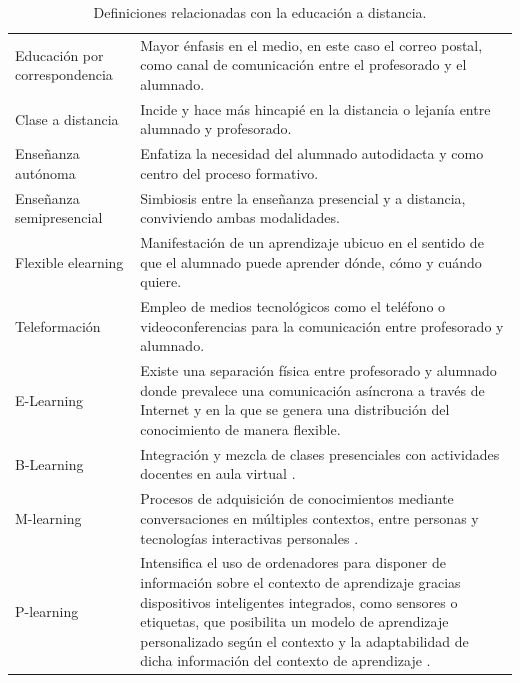 \documentclass[spanish]{textolivre}
\begin{document}
\begin{table}[h]
    \centering
    \begin{threeparttable}
    \caption{Definiciones relacionadas con la educación a distancia.}
    \label{tab01}
    \begin{tabular}{p{}p{}}
    \toprule
    Educación por correspondencia & Mayor énfasis en el medio, en este caso el correo postal, como canal de comunicación entre el profesorado y el alumnado. \\
    Clase a distancia & Incide y hace más hincapié en la distancia o lejanía entre alumnado y profesorado. \\
    Enseñanza autónoma & Enfatiza la necesidad del alumnado autodidacta y como centro del proceso formativo. \\
    Enseñanza semipresencial & Simbiosis entre la enseñanza presencial y a distancia, conviviendo ambas modalidades. \\
    Flexible elearning & Manifestación de un aprendizaje ubicuo en el sentido de que el alumnado puede aprender dónde, cómo y cuándo quiere. \\
    Teleformación & Empleo de medios tecnológicos como el teléfono o videoconferencias para la comunicación entre profesorado y alumnado. \\
    E-Learning & Existe una separación física entre profesorado y alumnado donde prevalece una comunicación asíncrona a través de Internet y en la que se genera una distribución del conocimiento de manera flexible. \\
    B-Learning & Integración y mezcla de clases presenciales con actividades docentes en aula virtual \cite{area_e-learning}. \\
    M-learning & Procesos de adquisición de conocimientos mediante conversaciones en múltiples contextos, entre personas y tecnologías interactivas personales \cite{sharples_theory_2010}. \\
    P-learning & Intensifica el uso de ordenadores para disponer de información sobre el contexto de aprendizaje gracias dispositivos inteligentes integrados, como sensores o etiquetas, que posibilita un modelo de aprendizaje personalizado según el contexto y la adaptabilidad de dicha información del contexto de aprendizaje \cite{maria_lujan_morfi_u-learning_2011}. \\
    \bottomrule
    \end{tabular}
    \end{threeparttable}
\end{table}
\end{document}
